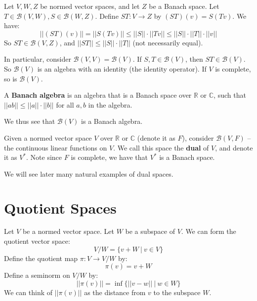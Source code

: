 \documentclass[a4paper,12pt]{report}
\newcommand{\ms}[1]{\mathscr{#1}}
\newenvironment{definition}[1][Definition.]{\begin{trivlist}
\item[\hskip \labelsep {\bfseries #1}]}{\end{trivlist}}
\newenvironment{example}[1][Example.]{\begin{trivlist}
\item[\hskip \labelsep {\bfseries #1}]}{\end{trivlist}}
\begin{document}
	\begin{example}
	Let $V, W, Z$ be normed vector spaces, and let $Z$ be a Banach space. Let $T \in \ms{B}(V, W), S \in \ms{B}(W, Z)$. Define $ST : V \rightarrow Z$ by $(ST)(v) = S(Tv)$. We have:
	\[ ||(ST)(v)|| = ||S(Tv)|| \leq ||S|| \cdot ||Tv|| \leq ||S|| \cdot ||T|| \cdot ||v|| \]
	So $ST \in \ms{B}(V, Z)$, and $||ST|| \leq ||S|| \cdot ||T||$ (not necessarily equal). 
	
	In particular, consider $\ms{B}(V, V) = \ms{B}(V)$. If $S, T \in \ms{B}(V)$, then $ST \in \ms{B}(V)$. So $\ms{B}(V)$ is an algebra with an identity (the identity operator). If $V$ is complete, so is $\ms{B}(V)$. 
	\end{example}
	
	\begin{definition}
	A \textbf{Banach algebra} is an algebra that is a Banach space over $\mathbb{R}$ or $\mathbb{C}$, such that $||ab|| \leq ||a|| \cdot ||b||$ for all $a, b$ in the algebra.
	\end{definition}
	
	\noindent We thus see that $\ms{B}(V)$ is a Banach algebra.
	
	\begin{definition}
	Given a normed vector space $V$ over $\mathbb{R}$ or $\mathbb{C}$ (denote it as $F$), consider $\ms{B}(V, F)$ -- the continuous linear functions on $V$. We call this space the \textbf{dual} of $V$, and denote it as $V^*$. Note since $F$ is complete, we have that $V^*$ is a Banach space. 
	\end{definition}

	\noindent We will see later many natural examples of dual spaces.
	
	\section{Quotient Spaces}
	
	Let $V$ be a normed vector space. Let $W$ be a subspace of $V$. We can form the quotient vector space:
	\[ V / W = \{v + W ~|~ v \in V \} \]
	Define the quotient map $\pi : V \rightarrow V / W$ by:
	\[ \pi(v) = v + W \]
	Define a seminorm on $V / W$ by:
	\[ ||\pi(v)|| = \inf \bigg\{ ||v - w|| ~\big|~ w \in W \bigg\} \]
	We can think of $||\pi(v)||$ as the distance from $v$ to the subspace $W$. 
	
\end{document}
